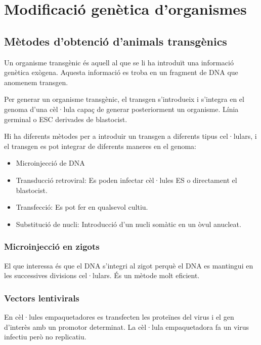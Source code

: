 \section{Modificació genètica d'organismes}
\label{sec:modif-genet-dorg}

\subsection{Mètodes d'obtenció d'animals transgènics}
\label{sec:metod-dobt-danim}

Un organisme transgènic és aquell al que se li ha introduït una
informació genètica exògena. Aquesta informació es troba en un
fragment de DNA que anomenem transgen.
 
Per generar un organisme transgènic, el transgen s'introdueix i
s'integra en el genoma d'una cèl·lula capaç de generar posteriorment
un organisme. Línia germinal o ESC derivades de blastocist.

Hi ha diferents mètodes per a introduir un transgen a diferents tipus
cel·lulars, i el transgen es pot integrar de diferents maneres en el
genoma:
\begin{itemize}
\item Microinjecció de DNA
\item Transducció retroviral: Es poden infectar cèl·lules ES o
  directament el blastocist.
\item Transfecció: Es pot fer en qualsevol cultiu.
\item Substitució de nucli: Introducció d'un nucli somàtic en un òvul
  anucleat.
\end{itemize}

\subsubsection{Microinjecció en zigots}
\label{sec:micr-en-igots}

El que interessa és que el DNA s'integri al zigot perquè el DNA es
mantingui en les successives divisions cel·lulars. És un mètode molt
eficient.

\subsubsection{Vectors lentivirals}
\label{sec:vectors-lentivirals}

En cèl·lules empaquetadores es transfecten les proteïnes del virus i
el gen d'interès amb un promotor determinat. La cèl·lula empaquetadora
fa un virus infectiu però no replicatiu.

